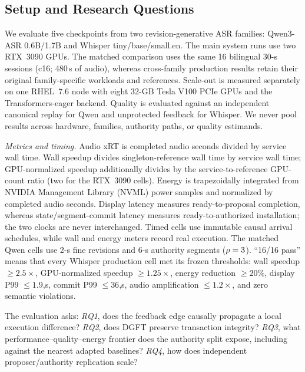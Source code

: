 
\subsection{Setup and Research Questions}\label{sec:eval:setup}

We evaluate five checkpoints from two revision-generative ASR families:
Qwen3-ASR 0.6B/1.7B and Whisper tiny/base/small.en. The main system runs use
two RTX~3090 GPUs. The matched comparison uses the same 16 bilingual 30-s
sessions (c16; 480\,s of audio), whereas cross-family production results retain
their original family-specific workloads and references. Scale-out is measured
separately on one RHEL~7.6 node with eight 32-GB Tesla V100 PCIe GPUs and the
Transformers-eager backend. Quality is evaluated against an independent
canonical replay for Qwen and unprotected feedback for Whisper. We never pool
results across hardware, families, authority paths, or quality estimands.

\emph{Metrics and timing.} Audio xRT is completed audio seconds divided by
service wall time. Wall speedup divides singleton-reference wall time by
service wall time; GPU-normalized speedup additionally divides by the
service-to-reference GPU-count ratio (two for the RTX~3090 cells). Energy is
trapezoidally integrated from NVIDIA Management Library (NVML) power samples
and normalized by completed
audio seconds. Display latency measures ready-to-proposal completion, whereas
state/segment-commit latency measures ready-to-authorized installation; the two
clocks are never interchanged. Timed cells use immutable causal arrival
schedules, while wall and energy meters record real execution. The matched
Qwen cells use 2-s fine revisions and 6-s authority segments
($\rho=3$). ``16/16 pass'' means that every Whisper production cell met
its frozen thresholds: wall speedup $\ge2.5\times$, GPU-normalized speedup
$\ge1.25\times$, energy reduction $\ge20\%$, display P99 $\le1.9$,s, commit
P99 $\le36$,s, audio amplification $\le1.2\times$, and zero semantic
violations.

The evaluation asks: \emph{RQ1}, does the feedback edge causally propagate a
local execution difference? \emph{RQ2}, does DGFT preserve transaction
integrity? \emph{RQ3}, what performance--quality--energy frontier does the
authority split expose, including against the nearest adapted baselines?
\emph{RQ4}, how does independent proposer/authority replication scale?

